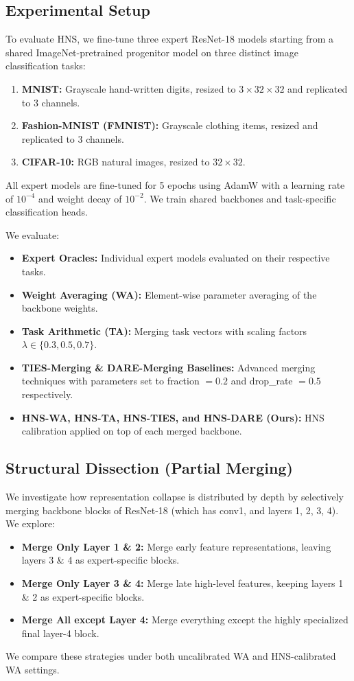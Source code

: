 \documentclass{article}
\theoremstyle{plain}
\theoremstyle{definition}
\theoremstyle{remark}
\begin{document}
\subsection{Experimental Setup}
To evaluate HNS, we fine-tune three expert ResNet-18 models starting from a shared ImageNet-pretrained progenitor model on three distinct image classification tasks:
\begin{enumerate}
  \item \textbf{MNIST:} Grayscale hand-written digits, resized to $3 \times 32 \times 32$ and replicated to 3 channels.
  \item \textbf{Fashion-MNIST (FMNIST):} Grayscale clothing items, resized and replicated to 3 channels.
  \item \textbf{CIFAR-10:} RGB natural images, resized to $32 \times 32$.
\end{enumerate}
All expert models are fine-tuned for 5 epochs using AdamW with a learning rate of $10^{-4}$ and weight decay of $10^{-2}$. We train shared backbones and task-specific classification heads.

We evaluate:
\begin{itemize}
  \item \textbf{Expert Oracles:} Individual expert models evaluated on their respective tasks.
  \item \textbf{Weight Averaging (WA):} Element-wise parameter averaging of the backbone weights.
  \item \textbf{Task Arithmetic (TA):} Merging task vectors with scaling factors $\lambda \in \{0.3, 0.5, 0.7\}$.
  \item \textbf{TIES-Merging \& DARE-Merging Baselines:} Advanced merging techniques with parameters set to fraction $= 0.2$ and drop\_rate $= 0.5$ respectively.
  \item \textbf{HNS-WA, HNS-TA, HNS-TIES, and HNS-DARE (Ours):} HNS calibration applied on top of each merged backbone.
\end{itemize}

\subsection{Structural Dissection (Partial Merging)}
We investigate how representation collapse is distributed by depth by selectively merging backbone blocks of ResNet-18 (which has conv1, and layers 1, 2, 3, 4). We explore:
\begin{itemize}
  \item \textbf{Merge Only Layer 1 \& 2:} Merge early feature representations, leaving layers 3 \& 4 as expert-specific blocks.
  \item \textbf{Merge Only Layer 3 \& 4:} Merge late high-level features, keeping layers 1 \& 2 as expert-specific blocks.
  \item \textbf{Merge All except Layer 4:} Merge everything except the highly specialized final layer-4 block.
\end{itemize}
We compare these strategies under both uncalibrated WA and HNS-calibrated WA settings.
\end{document}
